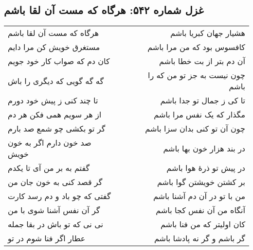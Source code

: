 \begin{center}
\section*{غزل شماره ۵۴۲: هرگاه که مست آن لقا باشم}
\label{sec:542}
\begin{longtable}{l p{0.5cm} r}
هرگاه که مست آن لقا باشم
&&
هشیار جهان کبریا باشم
\\
مستغرق خویش کن مرا دایم
&&
کافسوس بود که من مرا باشم
\\
کان دم که صواب کار خود جویم
&&
آن دم بتر از بت خطا باشم
\\
گه گه گویی که دیگری را باش
&&
چون نیست به جز تو من که را باشم
\\
تا چند کنی ز پیش خود دورم
&&
تا کی ز جمال تو جدا باشم
\\
از هر سویم همی فکن هر دم
&&
مگذار که یک نفس مرا باشم
\\
گر تو بکشی چو شمع صد بارم
&&
چون آن تو کنی بدان سزا باشم
\\
صد خون دارم اگر به خون خویش
&&
در بند هزار خون بها باشم
\\
گفتم به بر من آی تا یکدم
&&
در پیش تو ذرهٔ هوا باشم
\\
گر قصد کنی به خون جان من
&&
بر کشتن خویشتن گوا باشم
\\
گفتی که چو باد و دم رسد کارت
&&
من با تو در آن دم آشنا باشم
\\
گر آن نفس آشنا شوی با من
&&
آنگاه من آن نفس کجا باشم
\\
نی نی که تو باش در بقا جمله
&&
کان اولیتر که من فنا باشم
\\
عطار اگر فنا شوم در تو
&&
گر باشم و گر نه پادشا باشم
\\
\end{longtable}
\end{center}
